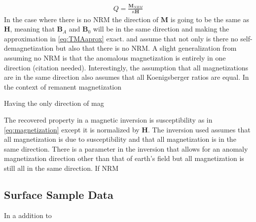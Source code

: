 \begin{align} \label{eq:Koenigsberger}
Q = \frac{\textbf{M}_{NRM}}{ \kappa\textbf{H}}
\end{align}
In the case where there is no \ac{NRM} the direction of $\mathbf M$ is going to be the same as $\mathbf H$, meaning that $\mathbf B_A$ and $\mathbf B_0$ will be in the same direction and making the approximation in \autoref{eq:TMAaprox} exact. \cite{li19963} and \cite{pilkington19973} assume that not only is there no self-demagnetization but also that there is no \ac{NRM}. A slight generalization from assuming no \ac{NRM} is that the anomalous magnetization is entirely in one direction (citation needed). Interestingly, the assumption that all magnetizations are in the same direction also assumes that all Koenigsberger ratios are equal.
	In the context of remanent magnetization 



Having the only direction of mag









The recovered property in a magnetic inversion is susceptibility as in \autoref{eq:magnetization} except it is normalized by $\textbf{H}$. The inversion used assumes that all magnetization is due to susceptibility and that all magnetization is in the same direction. There is a parameter in the inversion that allows for an anomaly magnetization direction other than that of earth's field but all magnetization is still all in the same direction. If \ac{NRM}






\subsection{Surface Sample Data}
\label{sec: Surface Sample Data}

In a addition to 






\endinput

Any text after an \endinput is ignored.
You could put scraps here or things in progress.
